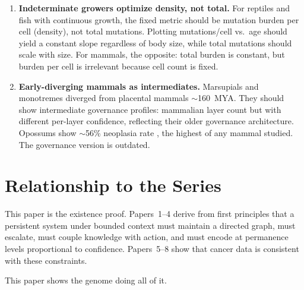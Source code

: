 \documentclass[11pt]{article}
\theoremstyle{definition}
\begin{document}
\begin{enumerate}
\item \textbf{Indeterminate growers optimize density, not total.}
   For reptiles and fish with continuous growth, the fixed metric
   should be mutation burden per cell (density), not total mutations.
   Plotting mutations/cell vs.\ age should yield a constant slope
   regardless of body size, while total mutations should scale with
   size. For mammals, the opposite: total burden is constant, but
   burden per cell is irrelevant because cell count is fixed.

\item \textbf{Early-diverging mammals as intermediates.} Marsupials
   and monotremes diverged from placental mammals $\sim$160~MYA.
   They should show intermediate governance profiles: mammalian layer
   count but with different per-layer confidence, reflecting their
   older governance architecture. Opossums show $\sim$56\% neoplasia
   rate \cite{Vincze2024}, the highest of any mammal studied. The
   governance version is outdated.
\end{enumerate}

\section{Relationship to the Series}
\label{sec:series}

This paper is the existence proof. Papers~1--4 derive from first
principles that a persistent system under bounded context must
maintain a directed graph, must escalate, must couple knowledge with
action, and must encode at permanence levels proportional to
confidence. Papers~5--8 show that cancer data is consistent with
these constraints.

This paper shows the genome doing all of it.
\end{document}
